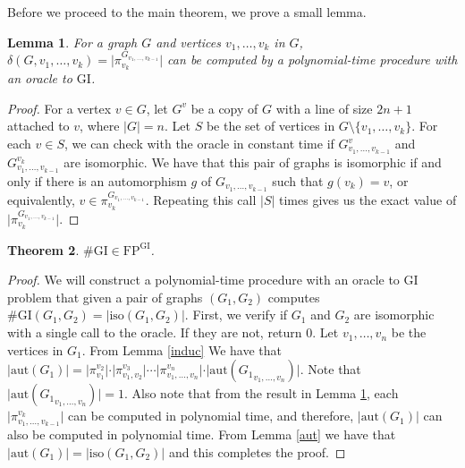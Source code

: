 \documentclass{article}
\def\shgi{\mbox{\#GI}}
\def\lgi{\mbox{GI}}
\def\fp{\mbox{FP}}
\def\aut{\mbox{aut}}
\def\iso{\mbox{iso}}
\newtheorem{theo}{Theorem}
\newtheorem{lemma}[theo]{Lemma}
\begin{document}
Before we proceed to the main theorem, we prove a small lemma.

\begin{lemma}\label{polypi}
	For a graph $G$ and vertices $v_1,\ldots,v_k$ in $G$, $\delta(G,v_1,\ldots,v_k) = \vert \pi^{G_{v_1,\ldots,v_{k-1}}}_{v_k} \vert$ can be computed by a polynomial-time procedure with an oracle to $\lgi$.
\end{lemma}
\begin{proof}
	For a vertex $v\in G$, let $G^{v}$ be a copy of $G$ with a line of size $2n+1$ attached to $v$, where $\vert G \vert = n$. Let $S$ be the set of vertices in $G\setminus\{v_1,\ldots,v_k\}$. For each $v\in S$, we can check with the oracle in constant time if $G^{v}_{v_1,\ldots,v_{k-1}}$ and $G^{v_k}_{v_1,\ldots,v_{k-1}}$ are isomorphic. We have that this pair of graphs is isomorphic if and only if there is an automorphism $g$ of $G_{v_1,\ldots,v_{k-1}}$ such that $g(v_k) = v$, or equivalently, $v\in \pi^{G_{v_1,\ldots,v_{k-1}}}_{v_k}$. Repeating this call $\vert S \vert$ times gives us the exact value of $\vert \pi^{G_{v_1,\ldots,v_{k-1}}}_{v_k} \vert$.
\end{proof}

\begin{theo}
	$\shgi\in\fp^{\lgi}$.
\end{theo}
\begin{proof}
	We will construct a polynomial-time procedure with an oracle to $\lgi$ problem that given a pair of graphs $(G_1,G_2)$ computes $\shgi(G_1,G_2) = \vert \iso(G_1,G_2) \vert$. First, we verify if $G_1$ and $G_2$ are isomorphic with a single call to the oracle. If they are not, return 0. Let $v_1,\ldots,v_n$ be the vertices in $G_1$. From Lemma \ref{induc} We have that $\vert\aut(G_1)\vert = \vert \pi^{v_2}_{v_1} \vert \cdot \vert \pi^{v_3}_{v_1,v_2} \vert \cdots \vert \pi^{v_n}_{v_1,\ldots,v_n} \vert\cdot\vert\aut({G_1}_{v_1,\ldots,v_n}) \vert$. Note that $\vert\aut({G_1}_{v_1,\ldots,v_n}) \vert = 1$. Also note that from the result in Lemma \ref{polypi}, each $\vert\pi^{v_k}_{v_1,\ldots,v_{k-1}}\vert$ can be computed in polynomial time, and therefore, $\vert \aut(G_1) \vert$ can also be computed in polynomial time. From Lemma \ref{aut} we have that $\vert \aut(G_1) \vert = \vert \iso(G_1,G_2) \vert$ and this completes the proof.
\end{proof}
\end{document}
